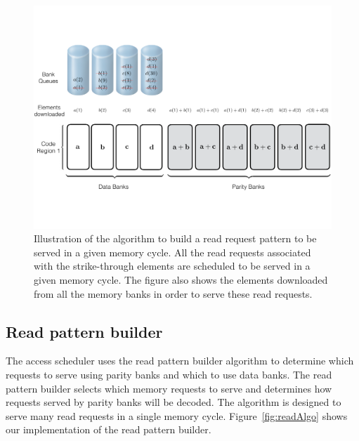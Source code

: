 \begin{figure}[htbp]
	\centering
	\includegraphics[width=0.96\linewidth]{fig/Read-Algo-Example.pdf}
	\caption{{Illustration of the algorithm to build a read request pattern to be served in a given memory cycle. All the read requests associated with the strike-through elements are scheduled to be served in a given memory cycle. The figure also shows the elements downloaded from all the memory banks in order to serve these read requests.}}
	\label{fig:readAlgoAccessPattern}
\end{figure}
\subsection{Read pattern builder}
\label{sec:readCodingAlgo}


The access scheduler uses the read pattern builder algorithm to determine which requests to serve using parity banks and which to use data banks. The read pattern builder selects which memory requests to serve and determines how requests served by parity banks will be decoded. The algorithm is designed to serve many read requests in a single memory cycle. Figure~\ref{fig:readAlgo} shows our implementation of the read pattern builder.

